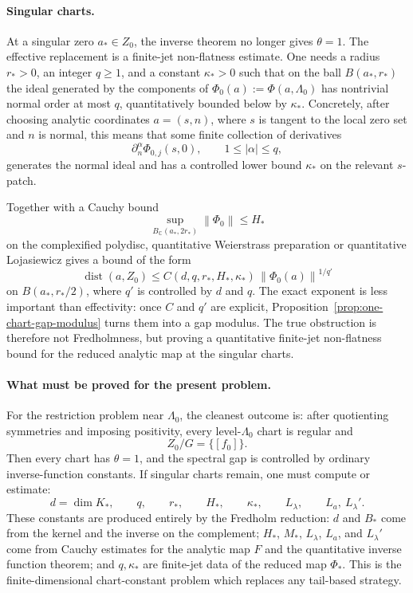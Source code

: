 \documentclass[12pt]{article}
\theoremstyle{definition}
\theoremstyle{remark}
\newcommand{\C}{\mathbb{C}}
\newcommand{\norm}[1]{\left\|#1\right\|}
\begin{document}
\paragraph{Singular charts.}
At a singular zero \(a_*\in Z_0\), the inverse theorem no longer gives
\(\theta=1\).  The effective replacement is a finite-jet non-flatness
estimate.  One needs a radius \(r_*>0\), an integer \(q\geq1\), and a
constant \(\kappa_*>0\) such that on the ball \(B(a_*,r_*)\) the ideal
generated by the components of
\(\Phi_0(a):=\Phi(a,\Lambda_0)\) has nontrivial normal order at most
\(q\), quantitatively bounded below by \(\kappa_*\).  Concretely, after
choosing analytic coordinates \(a=(s,n)\), where \(s\) is tangent to the
local zero set and \(n\) is normal, this means that some finite collection
of derivatives
\[
  \partial_n^\alpha \Phi_{0,j}(s,0),
  \qquad 1\leq|\alpha|\leq q,
\]
generates the normal ideal and has a controlled lower bound
\(\kappa_*\) on the relevant \(s\)-patch.

Together with a Cauchy bound
\[
  \sup_{B_\C(a_*,2r_*)}\norm{\Phi_0}\leq H_*
\]
on the complexified polydisc, quantitative Weierstrass preparation or
quantitative Lojasiewicz gives a bound of the form
\begin{equation}\label{eq:singular-loj-template}
  \operatorname{dist}(a,Z_0)
  \leq C(d,q,r_*,H_*,\kappa_*)\,
  \norm{\Phi_0(a)}^{1/q'}
\end{equation}
on \(B(a_*,r_*/2)\), where \(q'\) is controlled by \(d\) and \(q\).
The exact exponent is less important than effectivity: once
\(C\) and \(q'\) are explicit, Proposition~\ref{prop:one-chart-gap-modulus}
turns them into a gap modulus.  The true obstruction is therefore not
Fredholmness, but proving a quantitative finite-jet non-flatness bound
for the reduced analytic map at the singular charts.

\paragraph{What must be proved for the present problem.}
For the restriction problem near \(\Lambda_0\), the cleanest outcome is:
after quotienting symmetries and imposing positivity, every
level-\(\Lambda_0\) chart is regular and
\[
  Z_0/G=\{[f_0]\}.
\]
Then every chart has \(\theta=1\), and the spectral gap is controlled by
ordinary inverse-function constants.  If singular charts remain, one must
compute or estimate:
\[
  d=\dim K_*,
  \qquad q,
  \qquad r_*,
  \qquad H_*,
  \qquad \kappa_*,
  \qquad L_\lambda,
  \qquad L_a,\ L_\lambda'.
\]
These constants are produced entirely by the Fredholm reduction:
\(d\) and \(B_*\) come from the kernel and the inverse on the complement;
\(H_*\), \(M_*\), \(L_\lambda\), \(L_a\), and \(L_\lambda'\) come from
Cauchy estimates for the analytic map \(F\) and the quantitative inverse
function theorem; and \(q,\kappa_*\) are finite-jet data of the reduced
map \(\Phi_*\).  This is the finite-dimensional chart-constant problem
which replaces any tail-based strategy.
\end{document}
